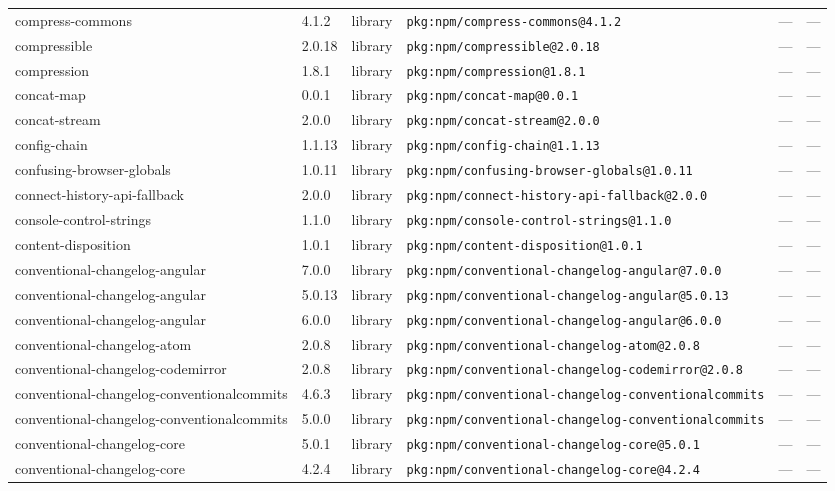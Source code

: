 \documentclass[11pt]{article}
\begin{document}
\begin{longtable}{|l|l|l|p{2.2cm}|l|p{4cm}|}
compress-commons & 4.1.2 & library & \texttt{pkg:npm/compress-commons@4.1.2} & — & — \\
compressible & 2.0.18 & library & \texttt{pkg:npm/compressible@2.0.18} & — & — \\
compression & 1.8.1 & library & \texttt{pkg:npm/compression@1.8.1} & — & — \\
concat-map & 0.0.1 & library & \texttt{pkg:npm/concat-map@0.0.1} & — & — \\
concat-stream & 2.0.0 & library & \texttt{pkg:npm/concat-stream@2.0.0} & — & — \\
config-chain & 1.1.13 & library & \texttt{pkg:npm/config-chain@1.1.13} & — & — \\
confusing-browser-globals & 1.0.11 & library & \texttt{pkg:npm/confusing-browser-globals@1.0.11} & — & — \\
connect-history-api-fallback & 2.0.0 & library & \texttt{pkg:npm/connect-history-api-fallback@2.0.0} & — & — \\
console-control-strings & 1.1.0 & library & \texttt{pkg:npm/console-control-strings@1.1.0} & — & — \\
content-disposition & 1.0.1 & library & \texttt{pkg:npm/content-disposition@1.0.1} & — & — \\
conventional-changelog-angular & 7.0.0 & library & \texttt{pkg:npm/conventional-changelog-angular@7.0.0} & — & — \\
conventional-changelog-angular & 5.0.13 & library & \texttt{pkg:npm/conventional-changelog-angular@5.0.13} & — & — \\
conventional-changelog-angular & 6.0.0 & library & \texttt{pkg:npm/conventional-changelog-angular@6.0.0} & — & — \\
conventional-changelog-atom & 2.0.8 & library & \texttt{pkg:npm/conventional-changelog-atom@2.0.8} & — & — \\
conventional-changelog-codemirror & 2.0.8 & library & \texttt{pkg:npm/conventional-changelog-codemirror@2.0.8} & — & — \\
conventional-changelog-conventionalcommits & 4.6.3 & library & \texttt{pkg:npm/conventional-changelog-conventionalcommits} & — & — \\
conventional-changelog-conventionalcommits & 5.0.0 & library & \texttt{pkg:npm/conventional-changelog-conventionalcommits} & — & — \\
conventional-changelog-core & 5.0.1 & library & \texttt{pkg:npm/conventional-changelog-core@5.0.1} & — & — \\
conventional-changelog-core & 4.2.4 & library & \texttt{pkg:npm/conventional-changelog-core@4.2.4} & — & — \\

\end{longtable}
\end{document}
